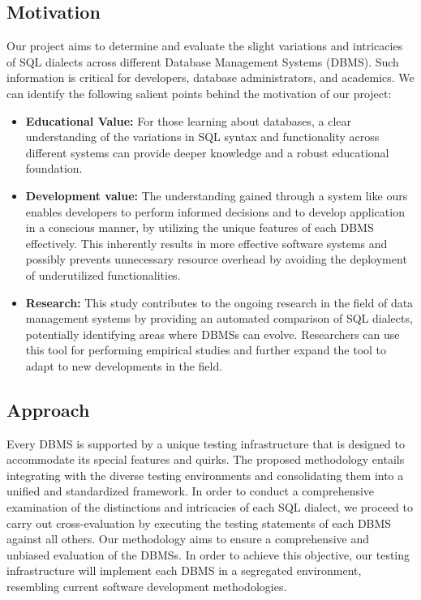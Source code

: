 \documentclass[acmsmall,nonacm]{acmart}
\begin{document}
\subsection{Motivation}
Our project aims to determine and evaluate the slight variations and intricacies of SQL dialects across different Database Management Systems (DBMS). Such information is critical for developers, database administrators, and academics. We can identify the following salient points behind the motivation of our project:
\begin{itemize}
\item \textbf{Educational Value:} For those learning about databases, a clear understanding of the variations in SQL syntax and functionality across different systems can provide deeper knowledge and a robust educational foundation.
\item \textbf{Development value:} The understanding gained through a system like ours enables developers to perform informed decisions and to develop application in a conscious manner, by utilizing the unique features of each DBMS effectively. This inherently results in more effective software systems and possibly prevents unnecessary resource overhead by avoiding the deployment of underutilized functionalities.
\item \textbf{Research:} This study contributes to the ongoing research in the field of data management systems by providing an automated comparison of SQL dialects, potentially identifying areas where DBMSs can evolve. Researchers can use this tool for performing empirical studies and further expand the tool to adapt to new developments in the field.
\end{itemize}
\subsection{Approach}
Every DBMS is supported by a unique testing infrastructure that is designed to accommodate its special features and quirks. The proposed methodology entails integrating with the diverse testing environments and consolidating them into a unified and standardized framework. In order to conduct a comprehensive examination of the distinctions and intricacies of each SQL dialect, we proceed to carry out cross-evaluation by executing the testing statements of each DBMS against all others. Our methodology aims to ensure a comprehensive and unbiased evaluation of the DBMSs. In order to achieve this objective, our testing infrastructure will implement each DBMS in a segregated environment, resembling current software development methodologies.
\end{document}
